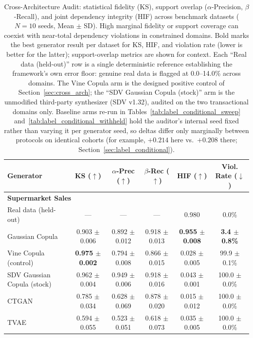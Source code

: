 \documentclass[pdflatex,sn-mathphys-num]{sn-jnl}
\theoremstyle{thmstyleone}%
\theoremstyle{thmstyletwo}%
\theoremstyle{thmstylethree}%
\begin{document}
\begin{table}[htbp]
\centering
\caption{Cross-Architecture Audit: statistical fidelity (KS), support overlap ($\alpha$-Precision, $\beta$-Recall), and joint dependency integrity (HIF) across benchmark datasets ($N=10$ seeds, Mean $\pm$ SD). High marginal fidelity or support coverage can coexist with near-total dependency violations in constrained domains. Bold marks the best generator result per dataset for KS, HIF, and violation rate (lower is better for the latter); support-overlap metrics are shown for context. Each ``Real data (held-out)'' row is a single deterministic reference establishing the framework's own error floor: genuine real data is flagged at 0.0--14.0\% across domains. The Vine Copula arm is the designed positive control of Section~\ref{sec:cross_arch}; the ``SDV Gaussian Copula (stock)'' arm is the unmodified third-party synthesizer (SDV v1.32), audited on the two transactional domains only. Baseline arms re-run in Tables~\ref{tab:label_conditional_sweep} and~\ref{tab:label_conditional_withheld} hold the auditor's internal seed fixed rather than varying it per generator seed, so deltas differ only marginally between protocols on identical cohorts (for example, $+0.214$ here vs.\ $+0.208$ there; Section~\ref{sec:label_conditional}).}
\label{tab:architecture}
\footnotesize
\setlength{\tabcolsep}{2.5pt}
\begin{tabular}{@{}lccccc@{}}
\toprule
Generator & KS ($\uparrow$) & $\alpha$-Prec ($\uparrow$) & $\beta$-Rec ($\uparrow$) & HIF ($\uparrow$) & Viol. Rate ($\downarrow$) \\
\midrule
\multicolumn{6}{l}{\textbf{Supermarket Sales}} \\
\quad Real data (held-out) & --- & --- & --- & 0.980 & 0.0\% \\
\quad Gaussian Copula & 0.903 $\pm$ 0.006 & 0.892 $\pm$ 0.012 & 0.918 $\pm$ 0.013 & \textbf{0.955 $\pm$ 0.008} & \textbf{3.4 $\pm$ 0.8\%} \\
\quad Vine Copula (control) &\textbf{0.975 $\pm$ 0.002} & 0.794 $\pm$ 0.008 & 0.866 $\pm$ 0.015 & 0.028 $\pm$ 0.005 & 99.9 $\pm$ 0.1\% \\
\quad SDV Gaussian Copula (stock) & 0.962 $\pm$ 0.004 & 0.949 $\pm$ 0.006 & 0.918 $\pm$ 0.016 & 0.043 $\pm$ 0.001 & 100.0 $\pm$ 0.0\% \\
\quad CTGAN           & 0.785 $\pm$ 0.034 & 0.628 $\pm$ 0.069 & 0.878 $\pm$ 0.020 & 0.015 $\pm$ 0.012 & 100.0 $\pm$ 0.0\% \\
\quad TVAE            & 0.594 $\pm$ 0.055 & 0.523 $\pm$ 0.051 & 0.618 $\pm$ 0.073 & 0.035 $\pm$ 0.005 & 100.0 $\pm$ 0.0\% \\

\end{tabular}
\end{table}
\end{document}
